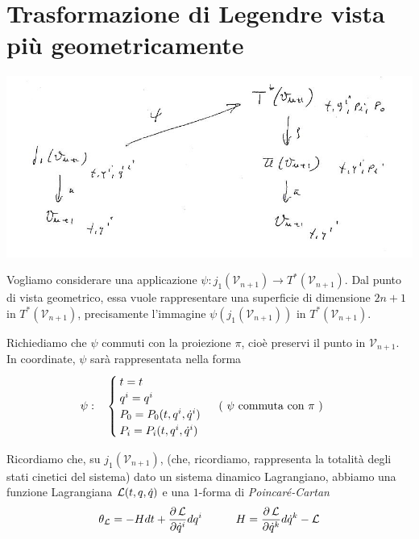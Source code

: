 \section{Trasformazione di Legendre vista più geometricamente}
\setcounter{equation}{0}

\begin{center}
\includegraphics[width=\columnwidth]{media/trasformazione-di-legendre-vista-piu-geometricamente/26-1.jpg}
\end{center}

Vogliamo considerare una applicazione $ \psi : j_1 (\mathcal{V}_{n+1}) \longrightarrow T^* (\mathcal{V}_{n+1}) $. Dal punto di vista geometrico, essa vuole rappresentare una superficie di dimensione $ 2n+1 $ in $ T^* (\mathcal{V}_{n+1}) $, precisamente l'immagine $ \psi (j_1 (\mathcal{V}_{n+1})) $ in $ T^* (\mathcal{V}_{n+1}) $.

Richiediamo che $ \psi $ commuti con la proiezione $ \pi $, cioè preservi il punto in $ \mathcal{V}_{n+1} $. In coordinate, $ \psi $ sarà rappresentata nella forma
\begin{equation*}
\begin{split} 
	\psi : \quad &
\begin{cases}
	t = t \\
	q^i = q^i \\
	P_0 = P_0 (t, q^i, \dot{q}^i) \\
	P_i = P_i (t, q^i, \dot{q}^i) \\
\end{cases}
	\text{ ( $ \psi $ commuta con $ \pi $ ) }
\end{split}
\end{equation*}

Ricordiamo che, su $ j_1 (\mathcal{V}_{n+1}) $, (che, ricordiamo, rappresenta la totalità degli stati cinetici del sistema) dato un sistema dinamico Lagrangiano, abbiamo una funzione Lagrangiana $ \operatorname{\mathcal{L}} (t, q, \dot{q}) $ e una $ 1 $-forma di \textit{Poincaré-Cartan}
\begin{equation*}
	\theta_{\operatorname{\mathcal{L}}} = - H dt + \frac{\partial \operatorname{\mathcal{L}}}{\partial \dot{q}^i} dq^i \quad \qquad H = \frac{\partial \operatorname{\mathcal{L}}}{\partial \dot{q}^k} d\dot{q}^k - \operatorname{\mathcal{L}}
\end{equation*}

